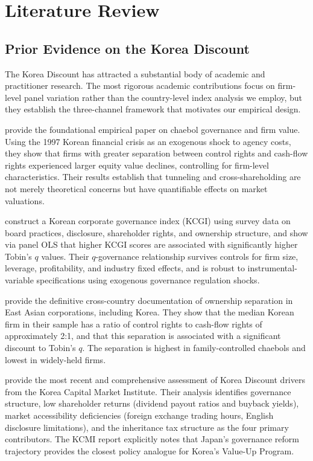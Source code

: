 \documentclass[12pt]{article}
\begin{document}
\section{Literature Review}
\label{sec:litreview}

\subsection{Prior Evidence on the Korea Discount}

The Korea Discount has attracted a substantial body of academic and practitioner research.
The most rigorous academic contributions focus on firm-level panel variation rather than
the country-level index analysis we employ, but they establish the three-channel framework
that motivates our empirical design.

\citet{baek2004} provide the foundational empirical paper on chaebol governance and firm
value. Using the 1997 Korean financial crisis as an exogenous shock to agency costs, they
show that firms with greater separation between control rights and cash-flow rights
experienced larger equity value declines, controlling for firm-level characteristics.
Their results establish that tunneling and cross-shareholding are not merely theoretical
concerns but have quantifiable effects on market valuations.

\citet{black2006} construct a Korean corporate governance index (KCGI) using survey data
on board practices, disclosure, shareholder rights, and ownership structure, and show via
panel OLS that higher KCGI scores are associated with significantly higher Tobin's $q$
values. Their $q$-governance relationship survives controls for firm size, leverage,
profitability, and industry fixed effects, and is robust to instrumental-variable
specifications using exogenous governance regulation shocks.

\citet{claessens2000} provide the definitive cross-country documentation of ownership
separation in East Asian corporations, including Korea. They show that the median Korean
firm in their sample has a ratio of control rights to cash-flow rights of approximately
2:1, and that this separation is associated with a significant discount to Tobin's $q$.
The separation is highest in family-controlled chaebols and lowest in widely-held firms.

\citet{kcmi2023} provide the most recent and comprehensive assessment of Korea Discount
drivers from the Korea Capital Market Institute. Their analysis identifies governance
structure, low shareholder returns (dividend payout ratios and buyback yields), market
accessibility deficiencies (foreign exchange trading hours, English disclosure limitations),
and the inheritance tax structure as the four primary contributors. The KCMI report
explicitly notes that Japan's governance reform trajectory provides the closest policy
analogue for Korea's Value-Up Program.
\end{document}
